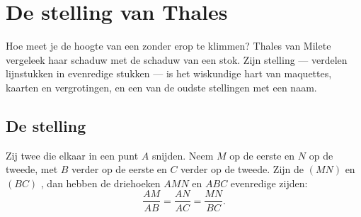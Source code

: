\chapter{De stelling van Thales}\label{ch:g9:thales}

Hoe meet je de hoogte van een  zonder erop te klimmen? Thales van Milete
vergeleek haar schaduw met de schaduw van een stok. Zijn stelling ---  verdelen lijnstukken in evenredige stukken --- is het wiskundige hart van
maquettes, kaarten en vergrotingen, en een van de oudste stellingen met een naam.

\section{De stelling}

\begin{theorem}[Thales]\label{thm:g9:thales:direct}
Zij twee  die elkaar in een punt $A$ snijden. Neem $M$ op de eerste  en
$N$ op de tweede, met $B$ verder op de eerste en $C$ verder op de tweede. Zijn de
 $(MN)$ en $(BC)$ \emph{}, dan hebben de driehoeken $AMN$ en $ABC$
evenredige zijden:
\[
\frac{AM}{AB} = \frac{AN}{AC} = \frac{MN}{BC}.
\]
\end{theorem}
\admitted

